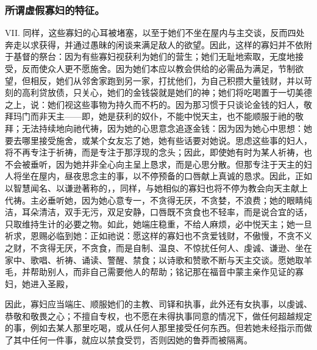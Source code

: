 
\subsubsection{所谓虚假寡妇的特征。}

VII. 同样，这些寡妇的心耳被堵塞，以至于她们不坐在屋内与主交谈，反而四处奔走以求获得，并通过愚昧的闲谈来满足敌人的欲望。因此，这样的寡妇并不依附于基督的祭台：因为有些寡妇视获利为她们的营生；她们无耻地索取，无度地接受，反而使众人更不愿施舍。因为她们本应以教会供给的必需品为满足，节制欲望，但相反，她们从邻舍家跑到另一家，打扰他们，为自己积攒大量钱财，并以苛刻的高利贷放债，只关心，她们的金钱袋就是她们的神；她们将吃喝置于一切美德之上，说：她们视这些事物为持久而不朽的。因为那习惯于只谈论金钱的妇人，敬拜玛门而非天主——即，她是获利的奴仆，不能中悦天主，也不能顺服于祂的敬拜；无法持续地向祂代祷，因为她的心思意念追逐金钱：因为因为她心中思想：她要去哪里接受施舍，或某个女友忘了她，她有些话要对她说。思虑这些事的妇人，将不再专注于祈祷，而是专注于那浮现的念头；因此，即使她有时为某人祈祷，也不会被垂听，因为她并非全心向主呈上恳求，而是心思分散。但那专注于天主的妇人将坐在屋内，昼夜思念主的事，以不停预备的口唇献上真诚的恳求。因此，正如以智慧闻名、以谦逊著称的，，同样，与她相似的寡妇也将不停为教会向天主献上代祷。主必垂听她，因为她心意专一，不贪得无厌，不贪婪，不浪费；她的眼睛纯洁，耳朵清洁，双手无污，双足安静，口唇既不贪食也不轻率，而是说合宜的话，只取维持生计的必要之物。如此，她端庄稳重，不给人麻烦，必中悦天主；她一旦祈求，恩赐必临到她：正如祂说：愿这样的寡妇也不贪爱钱财，不傲慢，不贪不义之财，不贪得无厌，不贪食，而是自制、温良、不惊扰任何人、虔诚、谦逊、坐在家中、歌唱、祈祷、诵读、警醒、禁食；以诗歌和赞歌不断与天主交谈。愿她取羊毛，并帮助别人，而非自己需要他人的帮助；铭记那在福音中蒙主亲作见证的寡妇，她进入圣殿，\par

因此，寡妇应当端庄、顺服她们的主教、司铎和执事，此外还有女执事，以虔诚、恭敬和敬畏之心；不擅自专权，也不愿在未得执事同意的情况下，做任何超越规定的事，例如去某人那里吃喝，或从任何人那里接受任何东西。但若她未经指示而做了其中任何一件事，就应以禁食受罚，否则因她的鲁莽而被隔离。\par

